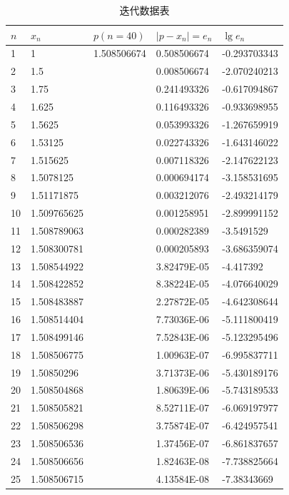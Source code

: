 \documentclass[UTF8,ctexart,a4paper,11pt,openany]{article}
\theoremstyle{definition}
\begin{document}
\begin{table}[htbp]
\centering
\caption{迭代数据表}
\begin{tabular}{|lllll|}\hline
$ n$     & $ x_n$  & $ p(n=40)$     & $ |p-x_n|=e_n$ &  $ \lg e_n$ \\\hline
1     & 1     & 1.508506674 & 0.508506674 & -0.293703343 \\
    2     & 1.5   &       & 0.008506674 & -2.070240213 \\
    3     & 1.75  &       & 0.241493326 & -0.617094867 \\
    4     & 1.625 &       & 0.116493326 & -0.933698955 \\
    5     & 1.5625 &       & 0.053993326 & -1.267659919 \\
    6     & 1.53125 &       & 0.022743326 & -1.643146022 \\
    7     & 1.515625 &       & 0.007118326 & -2.147622123 \\
    8     & 1.5078125 &       & 0.000694174 & -3.158531695 \\
    9     & 1.51171875 &       & 0.003212076 & -2.493214179 \\
    10    & 1.509765625 &       & 0.001258951 & -2.899991152 \\
    11    & 1.508789063 &       & 0.000282389 & -3.5491529 \\
    12    & 1.508300781 &       & 0.000205893 & -3.686359074 \\
    13    & 1.508544922 &       & 3.82479E-05 & -4.417392 \\
    14    & 1.508422852 &       & 8.38224E-05 & -4.076640029 \\
    15    & 1.508483887 &       & 2.27872E-05 & -4.642308644 \\
    16    & 1.508514404 &       & 7.73036E-06 & -5.111800419 \\
    17    & 1.508499146 &       & 7.52843E-06 & -5.123295496 \\
    18    & 1.508506775 &       & 1.00963E-07 & -6.995837711 \\
    19    & 1.50850296 &       & 3.71373E-06 & -5.430189176 \\
    20    & 1.508504868 &       & 1.80639E-06 & -5.743189533 \\
    21    & 1.508505821 &       & 8.52711E-07 & -6.069197977 \\
    22    & 1.508506298 &       & 3.75874E-07 & -6.424957541 \\
    23    & 1.508506536 &       & 1.37456E-07 & -6.861837657 \\
    24    & 1.508506656 &       & 1.82463E-08 & -7.738825664 \\
    25    & 1.508506715 &       & 4.13584E-08 & -7.38343669 \\\hline
\end{tabular}%
\label{tab:data}%
\end{table}%

\clearpage



\end{document}
